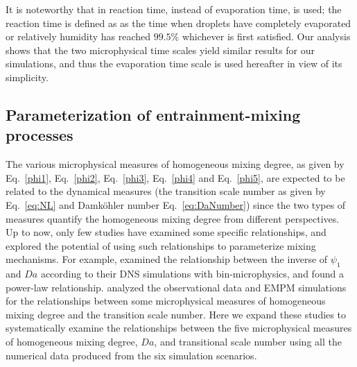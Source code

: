 \documentclass[draft,linenumbers]{AGUJournal}
\newcommand{\Eq}[1]{Eq.~\eqref{#1}} \newcommand{\Fig}[1]{Figure~\ref{#1}}
\begin{document}
It is noteworthy that in \citet{Lehmann2009} reaction time, instead of evaporation time, is used; the reaction time is defined as as the time when droplets have completely 
evaporated or relatively humidity has reached $99.5\%$ whichever is first satisfied. Our analysis shows that the two microphysical time scales yield similar results for our simulations, and thus the evaporation time scale is used hereafter in view of its simplicity.
 
\subsection{Parameterization of entrainment-mixing processes}
The various microphysical measures of homogeneous mixing degree, as given by \Eq{phi1}, \Eq{phi2}, \Eq{phi3}, \Eq{phi4} and \Eq{phi5}, are expected to be related to the dynamical measures (the transition scale number as given by \Eq{eq:NL} and Damk\"ohler number \Eq{eq:DaNumber}) since the two types of measures quantify the homogeneous mixing degree from different perspectives. Up to now, only few studies have examined some specific relationships, and explored the potential of using such relationships to parameterize mixing mechanisms. For example, \citet{And09} examined the relationship between the inverse of $\psi_1$ and $Da$ according to their DNS simulations with bin-microphysics, and found a power-law relationship. \citet{Lu2013, Lu2014} analyzed the observational data and EMPM simulations for the relationships between some microphysical measures of homogeneous mixing degree and the transition scale number. Here we expand these studies to systematically examine the relationships between the five microphysical measures of homogeneous mixing degree, $Da$, and transitional scale number using all the numerical data produced from the six simulation scenarios.
\end{document}
